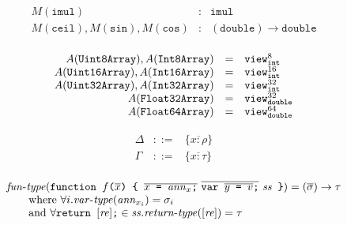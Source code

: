 \documentclass{article}
\newcommand{\funtype}{\mathit{fun}\mbox{-}\mathit{type}}
\newcommand{\vartype}{\mathit{var}\mbox{-}\mathit{type}}
\newcommand{\rettype}{\mathit{return}\mbox{-}\mathit{type}}
\newcommand{\funty}[2]{({#1}) \rightarrow {#2}}
\newcommand{\seq}[1]{\overline{{#1}}}
\newcommand{\mathjs}[1]{\mbox{\texttt{{#1}}}}
\newcommand{\mathjssm}[1]{\mbox{\texttt{\scriptsize {#1}}}}
\newcommand{\return}[1]{\mathjs{return }{#1}\mathjs{;}}
\newcommand{\fun}[3]{\mathjs{function }{#1}\mathjs{(}{#2}\mathjs{) \char123{} }{#3}\mathjs{ \char125{}}}
\newcommand{\var}[1]{\mathjs{var }{#1}\mathjs{;}}
\newcommand{\intsm}{\mathjssm{int}}
\newcommand{\doublesm}{\mathjssm{double}}
\newcommand{\double}{\mathtt{double}}
\newcommand{\view}[2]{\mathtt{view}^{#1}_{#2}}
\newcommand{\imul}{\mathtt{imul}}
\begin{document}
\[
\begin{array}{rcl}
M(\imul) & : & \imul \\
M(\mathtt{ceil}), M(\mathtt{sin}), M(\mathtt{cos}) & : & \funty{\double}{\double} \\
\end{array}
\]

\[
\begin{array}{rcl}
A(\mathtt{Uint8Array}), A(\mathtt{Int8Array})   & = & \view{8}{\intsm} \\
A(\mathtt{Uint16Array}), A(\mathtt{Int16Array}) & = & \view{16}{\intsm} \\
A(\mathtt{Uint32Array}), A(\mathtt{Int32Array}) & = & \view{32}{\intsm} \\
A(\mathtt{Float32Array})                        & = & \view{32}{\doublesm} \\
A(\mathtt{Float64Array})                        & = & \view{64}{\doublesm} \\
\end{array}
\]

\[
\begin{array}{rcl}
\Delta & ::= & \{ \seq{x : \rho} \} \\
\Gamma & ::= & \{ \seq{x : \tau} \} \\
\end{array}
\]

\[
\begin{array}{l}
\funtype(\fun{f}{\seq{x}}{\seq{x\mathjs{ = }\mathit{ann}_x\mathjs{;}}\ \seq{\var{\seq{y\mathjs{ = }v}}}\ \mathit{ss}}) = \funty{\seq{\sigma}}{\tau} \\
\qquad \mbox{where } \forall i . \vartype(\mathit{ann}_{x_i}) = \sigma_i \\
\qquad \mbox{and } \forall \return{[\mathit{re}]} \in \mathit{ss} . \rettype([\mathit{re}]) = \tau
\end{array}
\]
\end{document}

